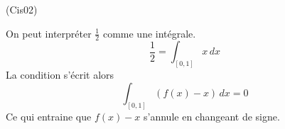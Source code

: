 \begin{tiny}(Cis02)\end{tiny} On peut interpréter $\frac{1}{2}$ comme une intégrale.
\begin{displaymath}
 \frac{1}{2}=\int_{[0,1]}x\,dx
\end{displaymath}
 La condition s'écrit alors
\begin{displaymath}
 \int_{[0,1]}(f(x)-x)\,dx = 0
\end{displaymath}
Ce qui entraine que $f(x)-x$ s'annule en changeant de signe. 